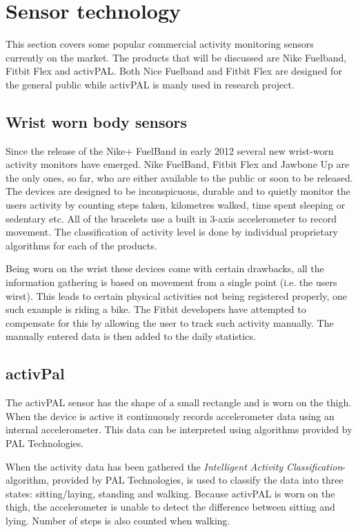 \section{Sensor technology}
This section covers some popular commercial activity monitoring sensors currently on the market. The products that will be discussed are Nike Fuelband, Fitbit Flex and activPAL. Both Nice Fuelband and Fitbit Flex are designed for the general public while activPAL is manly used in research project.

\subsection{Wrist worn body sensors}
Since the release of the Nike+ FuelBand \cite{fuelBand} in early 2012 several new wrist-worn activity monitors have emerged. Nike FuelBand, Fitbit Flex and Jawbone Up are the only ones, so far, who are either available to the public or soon to be released. The devices are designed to be inconspicuous, durable and to quietly monitor the users activity by counting steps taken, kilometres walked, time spent sleeping or sedentary etc. All of the bracelets use a built in 3-axis accelerometer to record movement. The classification of activity level is done by individual proprietary algorithms for each of the products. 

Being worn on the wrist these devices come with certain drawbacks, all the information gathering is based on movement from a single point (i.e. the users wirst). This leads to certain physical activities not being registered properly, one such example is riding a bike. The Fitbit developers have attempted to compensate for this by allowing the user to track such activity manually. The manually entered data is then added to the daily statistics. 

\subsection{activPal}
\label{sensorActivPal}
The activPAL sensor has the shape of a small rectangle and is worn on the thigh. When the device is active it continuously records accelerometer data using an internal accelerometer. This data can be interpreted using algorithms provided by PAL Technologies.

When the activity data has been gathered the \emph{Intelligent Activity Classification}-algorithm, provided by PAL Technologies, is used to classify the data into three states: sitting/laying, standing and walking. Because activPAL is worn on the thigh, the accelerometer is unable to detect the difference between sitting and lying. Number of steps is also counted when walking.


